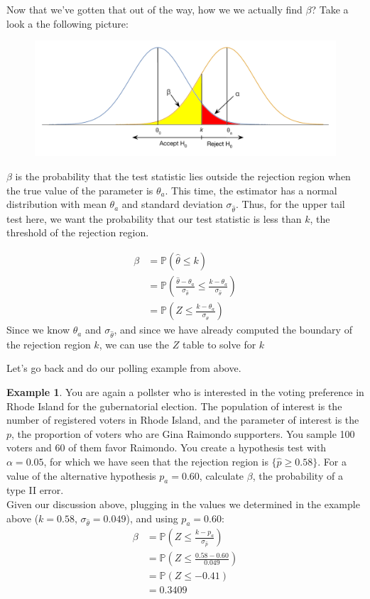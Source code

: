 \documentclass[12pt]{article}
\theoremstyle{definition}
\newtheorem*{example}{Example}
\theoremstyle{remark}
\def\P{{\mathbb P}}
\begin{document}
Now that we've gotten that out of the way, how we we actually find $\beta$? Take a look a the following picture:

\begin{figure}[H]
\centering
\includegraphics[width=12cm]{alphabeta}
\end{figure}

$\beta$ is the probability that the test statistic lies outside the rejection region when the true value of the parameter is $\theta_a$. This time, the estimator has a normal distribution with mean $\theta_a$ and standard deviation $\sigma_{\hat{\theta}}$. Thus, for the upper tail test here, we want the probability that our test statistic is less than $k$, the threshold of the rejection region.

\begin{align*}
\beta &= \P(\hat{\theta} \leq k)\\
&= \P\left( \frac{ \hat{\theta} - \theta_a }{ \sigma_{\hat{\theta}} } \leq \frac{ k - \theta_a}{\sigma_{\hat{\theta}} }\right) \\
&= \P\left( Z \leq \frac{ k - \theta_a}{\sigma_{\hat{\theta}}} \right)
\end{align*}
Since we know $\theta_a$ and $\sigma_{\hat{\theta}}$, and since we have already computed the boundary of the rejection region $k$, we can use the $Z$ table to solve for $k$

Let's go back and do our polling example from above.

\begin{example}
You are again a pollster who is interested in the voting preference in Rhode Island for the gubernatorial election. The population of interest is the number of registered voters in Rhode Island, and the parameter of interest is the $p$, the proportion of voters who are Gina Raimondo supporters. You sample 100 voters and 60 of them favor Raimondo. You create a hypothesis test with $\alpha = 0.05$, for which we have seen that the rejection region is $\{ \hat{p} \geq 0.58 \}$. For a value of the alternative hypothesis $p_a = 0.60$, calculate $\beta$, the probability of a type II error.\\

Given our discussion above, plugging in the values we determined in the example above ($k = 0.58$, $\sigma_{\hat{\theta}} = 0.049$), and using $p_a = 0.60$:
\begin{align*}
\beta &= \P\left( Z \leq \frac{ k - p_a}{\sigma_{\hat{p}}} \right) \\
&= \P\left( Z \leq \frac{ 0.58 - 0.60}{ 0.049 } \right) \\
&= \P (Z \leq -0.41 )\\
&= 0.3409
\end{align*}
\end{example}
\end{document}
